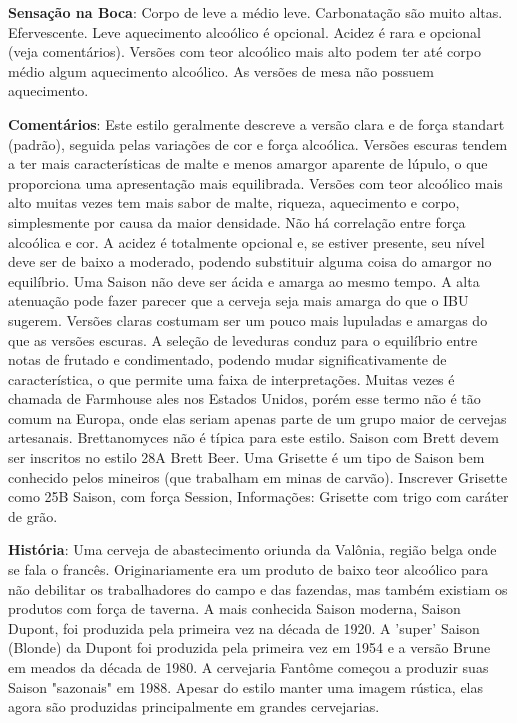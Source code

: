 \textbf{Sensação na Boca}: Corpo de leve a médio leve. Carbonatação são muito altas. Efervescente. Leve aquecimento alcoólico é opcional. Acidez é rara e opcional (veja comentários). Versões com teor alcoólico mais alto podem ter até corpo médio algum aquecimento alcoólico. As versões de mesa não possuem aquecimento.

\textbf{Comentários}: Este estilo geralmente descreve a versão clara e de força standart (padrão), seguida pelas variações de cor e força alcoólica. Versões escuras tendem a ter mais características de malte e menos amargor aparente de lúpulo, o que proporciona uma apresentação mais equilibrada. Versões com teor alcoólico mais alto muitas vezes tem mais sabor de malte, riqueza, aquecimento e corpo, simplesmente por causa da maior densidade. Não há correlação entre força alcoólica e cor. A acidez é totalmente opcional e, se estiver presente, seu nível deve ser de baixo a moderado, podendo substituir alguma coisa do amargor no equilíbrio. Uma Saison não deve ser ácida e amarga ao mesmo tempo. A alta atenuação pode fazer parecer que a cerveja seja mais amarga do que o IBU sugerem. Versões claras costumam ser um pouco mais lupuladas e amargas do que as versões escuras. A seleção de leveduras conduz para o equilíbrio entre notas de frutado e condimentado, podendo mudar significativamente de característica, o que permite uma faixa de interpretações. Muitas vezes é chamada de Farmhouse ales nos Estados Unidos, porém esse termo não é tão comum na Europa, onde elas seriam apenas parte de um grupo maior de cervejas artesanais. Brettanomyces não é típica para este estilo. Saison com Brett devem ser inscritos no estilo 28A Brett Beer. Uma Grisette é um tipo de Saison bem conhecido pelos mineiros (que trabalham em minas de carvão). Inscrever Grisette como 25B Saison, com força Session, Informações: Grisette com trigo com caráter de grão.

\textbf{História}: Uma cerveja de abastecimento oriunda da Valônia, região belga onde se fala o francês. Originariamente era um produto de baixo teor alcoólico para não debilitar os trabalhadores do campo e das fazendas, mas também existiam os produtos com força de taverna. A mais conhecida Saison moderna, Saison Dupont, foi produzida pela primeira vez na década de 1920. A 'super' Saison (Blonde) da Dupont foi produzida pela primeira vez em 1954 e a versão Brune em meados da década de 1980. A cervejaria Fantôme começou a produzir suas Saison "sazonais" em 1988. Apesar do estilo manter uma imagem rústica, elas agora são produzidas principalmente em grandes cervejarias.

